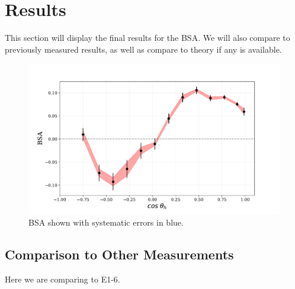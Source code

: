 \section{Results}
This section will display the final results for the BSA.  We will also compare to previously measured results, as well as compare to theory if any is available.


\begin{figure}
  \begin{center}
    \includegraphics[width=\columnwidth]{image/bsa_integrated.pdf}
    \caption{BSA shown with systematic errors in blue.}
  \end{center}
\end{figure}

\subsection{Comparison to Other Measurements}
Here we are comparing to E1-6.
